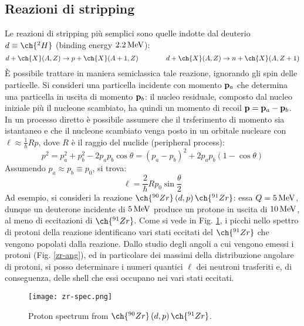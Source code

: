 \subsection{Reazioni di stripping}

Le reazioni di stripping più semplici sono quelle indotte dal deuterio $ d \equiv \ch{^2H} $ (binding energy $ 2.2\,\mathrm{MeV} $):
\begin{equation*}
	d + \ch{X}(A,Z) \rightarrow p + \ch{X}(A+1,Z)
	\qquad \qquad
	d + \ch{X}(A,Z) \rightarrow n + \ch{X}(A,Z+1)
\end{equation*}
È possibile trattare in maniera semiclassica tale reazione, ignorando gli spin delle particelle. Si consideri una particella incidente con momento $ \mathbf{p}_a $ che determina una particella in uscita di momento $ \mathbf{p}_b $: il nucleo residuale, composto dal nucleo iniziale più il nucleone scambiato, ha quindi un momento di recoil $ \mathbf{p} = \mathbf{p}_a - \mathbf{p}_b $. In un processo diretto è possibile assumere che il trsferimento di momento sia istantaneo e che il nucleone scambiato venga posto in un orbitale nucleare con $ \ell \approx \frac{1}{\hbar} Rp $, dove $ R $ è il raggio del nuclide (peripheral process):
\begin{equation*}
	p^2 = p_a^2 + p_b^2 - 2 p_a p_b \cos \theta = \left( p_a - p_b \right)^2 + 2 p_a p_b \left( 1 - \cos \theta \right)
\end{equation*}
Assumendo $ p_a \approx p_b \equiv p_0 $, si trova:
\begin{equation}
	\ell = \frac{2}{\hbar} R p_0 \sin \frac{\theta}{2}
	\label{eq:6.7}
\end{equation}
Ad esempio, si consideri la reazione $ \ch{^{90}Zr} \left( d,p \right) \ch{^{91}Zr} $: essa $ Q = 5\,\mathrm{MeV} $, dunque un deuterone incidente di $ 5\,\mathrm{MeV} $ produce un protone in uscita di $ 10\,\mathrm{MeV} $, al meno di eccitazioni di $ \ch{^{91}Zr} $.
Come si vede in Fig. \ref{zr-spec}, i picchi nello spettro di protoni della reazione identificano vari stati eccitati del $ \ch{^{91}Zr} $ che vengono popolati dalla reazione. Dallo studio degli angoli a cui vengono emessi i protoni (Fig. \ref{zr-ang}), ed in particolare dei massimi della distribuzione angolare di protoni, si posso determinare i numeri quantici $ \ell $ dei neutroni trasferiti e, di conseguenza, delle shell che essi occupano nei vari stati eccitati.

\begin{figure}[H]
	\centering
	\texttt{[image: zr-spec.png]}
	\caption{Proton spectrum from $ \ch{^{90}Zr} \left( d,p \right) \ch{^{91}Zr} $.}
	\label{zr-spec}
\end{figure}

